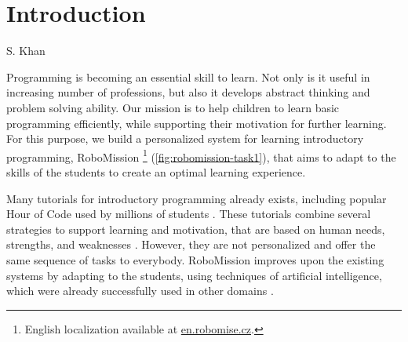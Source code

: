 \chapter{Introduction}
\label{chap:introduction}


{S. Khan}

Programming is becoming an essential skill to learn.
Not only is it useful in increasing number of professions,
but also it develops abstract thinking and problem solving ability. %
Our mission is to help children to learn basic programming efficiently,
while supporting their motivation for further learning.
For this purpose, we build a personalized system for learning introductory
programming, RoboMission%
\footnote{English localization available at \url{en.robomise.cz}.}
(\cref{fig:robomission-task1}),
that aims to adapt to the skills of the students
to create an optimal learning experience.

Many tutorials for introductory programming already exists,
including popular Hour of Code used by millions of students \cite{hour-of-code}.
These tutorials combine several strategies to support learning and motivation,
that are based on human needs, strengths, and weaknesses
\cite{lowering-barriers}.
However, they are not personalized and offer the same sequence of tasks
to everybody.
RoboMission improves upon the existing systems by adapting to the
students, using techniques of artificial intelligence,
which were already successfully used in other domains
\cite{mathsgarden, alg.evaluation-geography, matmat.response-times}.


